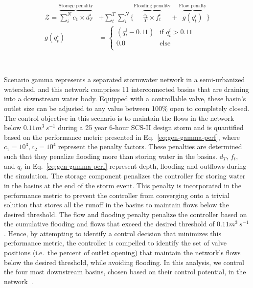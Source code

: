 \begin{subequations}\label{eq:gen-gamma-perf}
\begin{align}
	\mathcal{Z} =  \overbrace{\sum_i^N c_1 \times d^i_T}^{\text{Storage penality}} &+ \sum^T_t \sum_i^N \Big\{ \overbrace{\frac{c_2 }{T} \times f^i_t}^{\text{Flooding penality}} + \overbrace{g(q^i_t)}^{\text{Flow penalty}} \Big\}\\
	g(q^i_t) &= \begin{cases}	
		(q^i_t - 0.11) &\text{if } q^i_t > 0.11\\
		0.0 &\text{else }\\
	\end{cases}
\end{align}
\end{subequations}

\

Scenario gamma represents a separated stormwater network in a semi-urbanized watershed, and this network comprises 11 interconnected basins that are draining into a downstream water body.
Equipped with a controllable valve, these basin's outlet size can be adjusted to any value between 100\% open to completely closed.
The control objective in this scenario is to maintain the flows in the network below $0.11 m^3\ s^{-1}$ during a 25 year 6-hour SCS-II design storm and is quantified based on the performance metric presented in Eq.~\ref{eq:gen-gamma-perf}, where $c_1=10^3, c_2=10^4$ represent the penalty factors.
These penalties are determined such that they penalize flooding more than storing water in the basins.
$d_T$, $f_t$, and $q_t$ in Eq.~\ref{eq:gen-gamma-perf} represent depth, flooding and outflows during the simulation.
The storage component penalizes the controller for storing water in the basins at the end of the storm event.
This penalty is incorporated in the performance metric to prevent the controller from converging onto a trivial solution that stores all the runoff in the basins to maintain flows below the desired threshold.
The flow and flooding penalty penalize the controller based on the cumulative flooding and flows that exceed the desired threshold of $0.11 m^3\ s^{-1}$.
Hence, by attempting to identify a control decision that minimizes this performance metric, the controller is compelled to identify the set of valve positions (i.e.\ the percent of outlet opening) that maintain the network's flows below the desired threshold, while avoiding flooding.
In this analysis, we control the four most downstream basins, chosen based on their control potential, in the network~\cite{Mullapudi_Lewis_Gruden_Kerkez_2020, schutze_sewer_2008}. 

